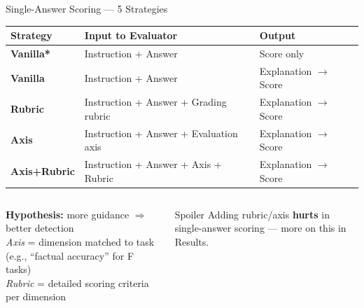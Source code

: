 \documentclass[aspectratio=169,10pt]{beamer}
\begin{document}
\begin{frame}{Single-Answer Scoring — 5 Strategies}
  \begin{center}
  \small
  \begin{tabular}{llp{7cm}}
    \toprule
    \textbf{Strategy} & \textbf{Input to Evaluator} & \textbf{Output} \\
    \midrule
    \textbf{Vanilla*}      & Instruction + Answer & Score only \\
    \textbf{Vanilla}       & Instruction + Answer & Explanation $\to$ Score \\
    \textbf{Rubric}        & Instruction + Answer + Grading rubric & Explanation $\to$ Score \\
    \textbf{Axis}          & Instruction + Answer + Evaluation axis & Explanation $\to$ Score \\
    \textbf{Axis+Rubric}   & Instruction + Answer + Axis + Rubric & Explanation $\to$ Score \\
    \bottomrule
  \end{tabular}
  \end{center}

  \vspace{0.5em}
  \begin{columns}[T]
      \textbf{Hypothesis:} more guidance $\Rightarrow$ better detection\\[0.3em]
      \textit{Axis} = dimension matched to task (e.g., ``factual accuracy'' for F tasks)\\
      \textit{Rubric} = detailed scoring criteria per dimension
      \begin{alertblock}{Spoiler}
        Adding rubric/axis \textbf{hurts} in single-answer scoring — more on this in Results.
      \end{alertblock}
  \end{columns}
\end{frame}
\end{document}
